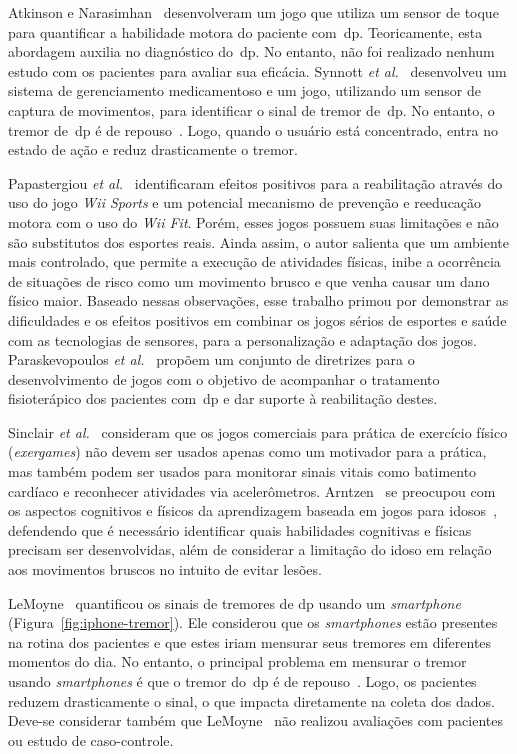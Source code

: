 Atkinson e Narasimhan~\cite{atkinson2010} desenvolveram um jogo que utiliza um sensor de toque para quantificar a habilidade motora do paciente com~\ac{dp}. Teoricamente, esta abordagem auxilia no diagnóstico do~\ac{dp}. No entanto, não foi realizado nenhum estudo com os pacientes para avaliar sua eficácia. Synnott \textit{et al.}~\cite{synnott_wiipd_2012} desenvolveu um sistema de gerenciamento medicamentoso e um jogo, utilizando um sensor de captura de movimentos, para identificar o sinal de tremor de~\ac{dp}. No entanto, o tremor de~\ac{dp} é de repouso~\cite{national2006parkinson}. Logo, quando o usuário está concentrado, entra no estado de ação e reduz drasticamente o tremor.

Papastergiou \textit{et al.}~\cite{Papastergiou:2009:EPC:1570538.1570707} identificaram efeitos positivos para a reabilitação através do uso do jogo \textit{Wii Sports} e um potencial mecanismo de prevenção e reeducação motora com o uso do \textit{Wii Fit}. Porém, esses jogos possuem suas limitações e não são substitutos dos esportes reais. Ainda assim, o autor salienta que um ambiente mais controlado, que permite a execução de atividades físicas, inibe a ocorrência de situações de risco como um movimento brusco e que venha causar um dano físico maior. Baseado nessas observações, esse trabalho primou por demonstrar as dificuldades e os efeitos positivos em combinar os jogos sérios de esportes e saúde com as tecnologias de sensores, para a personalização e adaptação dos jogos. Paraskevopoulos \textit{et al.}~\cite{sacbespoke2014} propõem um conjunto de diretrizes para o desenvolvimento de jogos com o objetivo de acompanhar o tratamento fisioterápico dos pacientes com~\ac{dp} e dar suporte à reabilitação 
destes.

Sinclair \textit{et al.}~\cite{Sinclair:2009:UVB:1515604.1515617} consideram que os jogos comerciais para prática de exercício físico (\textit{exergames}) não devem ser usados apenas como um motivador para a prática, mas também podem ser usados para monitorar sinais vitais como batimento cardíaco e reconhecer atividades via acelerômetros. Arntzen~\cite{arntzen2011} se preocupou com os aspectos cognitivos e físicos da aprendizagem baseada em jogos para idosos~\cite{arntzen2011}, defendendo que é necessário identificar quais habilidades cognitivas e físicas precisam ser desenvolvidas, além de considerar a limitação do idoso em relação aos movimentos bruscos no intuito de evitar lesões.

LeMoyne~\cite{lemoyne2010} quantificou os sinais de tremores de \ac{dp} usando um \textit{smartphone} (Figura~\ref{fig:iphone-tremor}). Ele considerou que os \textit{smartphones} estão presentes na rotina dos pacientes e que estes iriam mensurar seus tremores em diferentes momentos do dia. No entanto, o principal problema em mensurar o tremor usando \textit{smartphones} é que o tremor do~\ac{dp} é de repouso~\cite{jankovic2008}. Logo, os pacientes reduzem drasticamente o sinal, o que impacta diretamente na coleta dos dados. Deve-se considerar também que LeMoyne~\cite{lemoyne2010} não realizou avaliações com pacientes ou estudo de caso-controle. 

